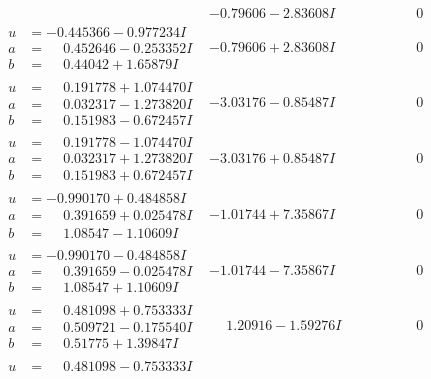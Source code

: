 \documentclass[1p]{elsarticle_modified}
\theoremstyle{definition}
\begin{document}
$$\begin{array}{c|c|c}
 & -0.79606 - 2.83608 I & \phantom{-0.000000 } 0 \\ \hline\begin{aligned}
u &= -0.445366 - 0.977234 I \\
a &= \phantom{-}0.452646 - 0.253352 I \\
b &= \phantom{-}0.44042 + 1.65879 I\end{aligned}
 & -0.79606 + 2.83608 I & \phantom{-0.000000 } 0 \\ \hline\begin{aligned}
u &= \phantom{-}0.191778 + 1.074470 I \\
a &= \phantom{-}0.032317 - 1.273820 I \\
b &= \phantom{-}0.151983 - 0.672457 I\end{aligned}
 & -3.03176 - 0.85487 I & \phantom{-0.000000 } 0 \\ \hline\begin{aligned}
u &= \phantom{-}0.191778 - 1.074470 I \\
a &= \phantom{-}0.032317 + 1.273820 I \\
b &= \phantom{-}0.151983 + 0.672457 I\end{aligned}
 & -3.03176 + 0.85487 I & \phantom{-0.000000 } 0 \\ \hline\begin{aligned}
u &= -0.990170 + 0.484858 I \\
a &= \phantom{-}0.391659 + 0.025478 I \\
b &= \phantom{-}1.08547 - 1.10609 I\end{aligned}
 & -1.01744 + 7.35867 I & \phantom{-0.000000 } 0 \\ \hline\begin{aligned}
u &= -0.990170 - 0.484858 I \\
a &= \phantom{-}0.391659 - 0.025478 I \\
b &= \phantom{-}1.08547 + 1.10609 I\end{aligned}
 & -1.01744 - 7.35867 I & \phantom{-0.000000 } 0 \\ \hline\begin{aligned}
u &= \phantom{-}0.481098 + 0.753333 I \\
a &= \phantom{-}0.509721 - 0.175540 I \\
b &= \phantom{-}0.51775 + 1.39847 I\end{aligned}
 & \phantom{-}1.20916 - 1.59276 I & \phantom{-0.000000 } 0 \\ \hline\begin{aligned}
u &= \phantom{-}0.481098 - 0.753333 I \\

\end{aligned}
\end{array}$$
\end{document}
